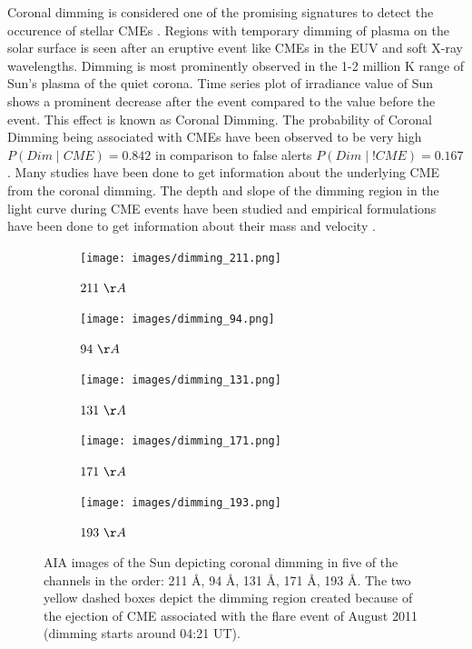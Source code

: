 Coronal dimming is considered one of the promising signatures to detect the occurence of stellar CMEs \citep{Namekata2022-dm}. Regions with temporary dimming of plasma on the solar surface is seen after an eruptive event like CMEs in the EUV and soft X-ray wavelengths. Dimming is most prominently observed in the 1-2 million K range of Sun's plasma of the quiet corona. Time series plot of irradiance value of Sun shows a prominent decrease after the event compared to the value before the event. This effect is known as Coronal Dimming. The probability of Coronal Dimming being associated with CMEs have been observed to be very high $P(Dim \mid CME) = 0.842$ in comparison to false alerts $P(Dim \mid !CME) = 0.167$ \citep{Veronig2021-rf}. Many studies have been done to get information about the underlying CME from the coronal dimming. The depth and slope of the dimming region in the light curve during CME events have been studied and empirical formulations have been done to get information about their mass and velocity \citep{Mason2016}.\\

\begin{figure}[h!]

    \begin{subfigure}[b]{0.3\textwidth}
        \centering
        \texttt{[image: images/dimming\_211.png]}
        \caption{$211 \ \AA$}
        \label{fig:dimming_211}
    \end{subfigure}
    \hfill
    \begin{subfigure}[b]{0.3\textwidth}
        \centering
        \texttt{[image: images/dimming\_94.png]}
        \caption{$94 \ \AA$}
        \label{fig:dimming_94}
    \end{subfigure}
    \hfill
    \begin{subfigure}[b]{0.3\textwidth}
        \centering
        \texttt{[image: images/dimming\_131.png]}
        \caption{$131 \ \AA$}
        \label{fig:dimming_131}
    \end{subfigure}

    \hfill
    \begin{subfigure}[b]{0.3\textwidth}
        \centering
        \texttt{[image: images/dimming\_171.png]}
        \caption{$171 \ \AA$}
        \label{fig:dimming_171}
    \end{subfigure}
    \hspace{0.5cm}
    \begin{subfigure}[b]{0.3\textwidth}
        \centering
        \texttt{[image: images/dimming\_193.png]}
        \caption{$193 \ \AA$}
        \label{fig:dimming_193}
    \end{subfigure}
    \hfill
    \label{fig:dimming_5_channels}
    \caption[AIA images of Coronal Dimming regions on the Sun]{AIA images of the Sun depicting coronal dimming in five of the channels in the order: 211 \AA, 94 \AA, 131 \AA, 171 \AA, 193 \AA. The two yellow dashed boxes depict the dimming region created because of the ejection of CME associated with the flare event of  August 2011 (dimming starts around 04:21 UT).}
\end{figure}

